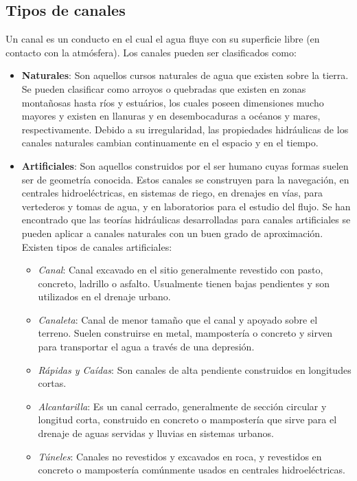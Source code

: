 \documentclass[11pt, oneside]{article}
\begin{document}
\subsection{Tipos de canales}
Un canal es un conducto en el cual el agua fluye con su superficie libre (en contacto con la atmósfera). Los canales pueden ser clasificados como:
\begin{itemize}
\item \textbf{Naturales}: Son aquellos cursos naturales de agua que existen sobre la tierra. Se pueden clasificar como arroyos o quebradas que existen en zonas montañosas hasta r\'ios y estu\'arios, los cuales poseen dimensiones mucho mayores y existen en llanuras y en desembocaduras a océanos y mares, respectivamente. Debido a su irregularidad, las propiedades hidr\'aulicas de los canales naturales cambian continuamente en el espacio y en el tiempo. 
\item \textbf{Artificiales}: Son aquellos construidos por el ser humano cuyas formas suelen ser de geometr\'ia conocida. Estos canales  se construyen para la navegaci\'on, en centrales hidroel\'ectricas, en sistemas de riego, en drenajes en v\'ias, para vertederos y tomas de agua, y en laboratorios para el estudio del flujo. Se han encontrado que las teor\'ias hidr\'aulicas desarrolladas para canales artificiales se pueden aplicar a canales naturales con un buen grado de aproximaci\'on.  Existen tipos de canales artificiales:

\begin{itemize}
\item \emph{Canal}: Canal excavado en el sitio generalmente revestido con pasto, concreto, ladrillo o asfalto. Usualmente tienen bajas pendientes y son utilizados en el drenaje urbano.
\item \emph{Canaleta}: Canal de menor tamaño que el canal y apoyado sobre el terreno. Suelen construirse en metal, mamposter\'ia o concreto y sirven para transportar el agua  a trav\'es de una depresi\'on. 
\item \emph{Rápidas y Caídas}: Son canales de alta pendiente construidos en longitudes cortas. 
\item \emph{Alcantarilla}: Es un canal cerrado, generalmente de secci\'on circular y longitud corta, construido en concreto o mampostería que sirve para el drenaje de aguas servidas y lluvias en sistemas urbanos. 
\item \emph{T\'uneles}: Canales no revestidos y excavados en roca, y revestidos en concreto o mamposter\'ia comúnmente usados en centrales hidroel\'ectricas. 
\end{itemize}
\end{itemize}
\end{document}
